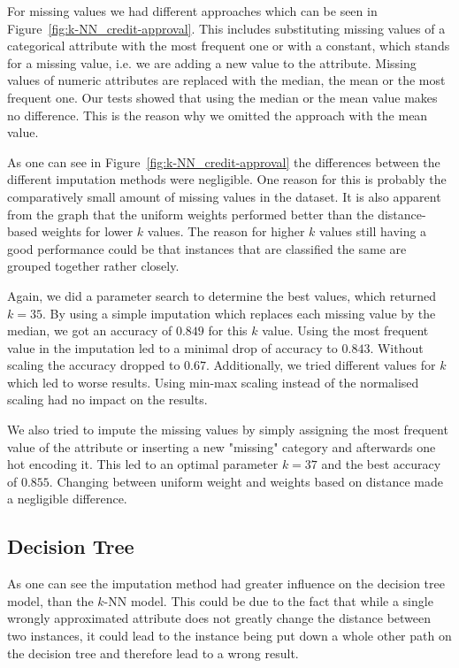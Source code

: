 \documentclass[a4paper,11pt]{article}
\begin{document}
        For missing values we had different approaches which can be seen in Figure~\ref{fig:k-NN_credit-approval}. This includes substituting missing values of a categorical attribute with the most frequent one or with a constant, which stands for a missing value, i.e. we are adding a new value to the attribute. Missing values of numeric attributes are replaced with the median, the mean or the most frequent one. Our tests showed that using the median or the mean value makes no difference. This is the reason why we omitted the approach with the mean value.
        
        As one can see in Figure~\ref{fig:k-NN_credit-approval} the differences between the different imputation methods were negligible. One reason for this is probably the comparatively small amount of missing values in the dataset.
        It is also apparent from the graph that the uniform weights performed better than the distance-based weights for lower $k$ values. The reason for higher $k$ values still having a good performance could be that instances that are classified the same are grouped together rather closely.
        
        Again, we did a parameter search to determine the best values, which returned $k=35$. By using a simple imputation which replaces each missing value by the median, we got an accuracy of 
        $0.849$ for this $k$ value. Using the most frequent value in the imputation led to a minimal drop of accuracy to $0.843$. Without scaling the accuracy dropped to $0.67$. Additionally, we tried different values for $k$ which led to worse results. Using min-max scaling instead of the normalised scaling had no impact on the results.
        
        We also tried to impute the missing values by simply assigning the most frequent value of the attribute or inserting a new "missing" category and afterwards one hot encoding it. This led to an optimal parameter $k=37$ and the best accuracy of $0.855$. Changing between uniform weight and weights based on distance made a negligible difference.
        
        
    \subsection{Decision Tree}
        As one can see the imputation method had greater influence on the decision tree model, than the $k$-NN model. This could be due to the fact that while a single wrongly approximated attribute does not greatly change the distance between two instances, it could lead to the instance being put down a whole other path on the decision tree and therefore lead to a wrong result.  
        
\end{document}

